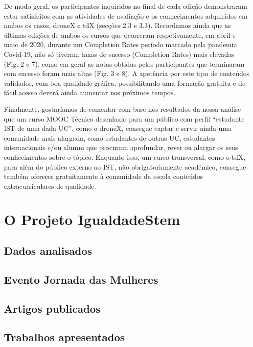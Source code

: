 De modo geral, os participantes inquiridos no final de cada edição demonstraram estar satisfeitos com as atividades de avaliação e os conhecimentos adquiridos em ambos os casos, droneX e tdX (secções 2.3 e 3.3). Recordamos ainda que as últimas edições de ambos os cursos que ocorreram respetivamente, em abril e maio de 2020, durante um
Completion Rates período marcado pela pandemia Covid-19, não só tiveram taxas de sucesso (Completion Rates) mais elevadas (Fig. 2 e
7), como em geral as notas obtidas pelos participantes que terminaram com sucesso foram mais altas (Fig. 3 e 8). A apetência por este tipo de conteúdos validados, com boa qualidade gráfica, possibilitando uma formação gratuita e de fácil acesso deverá ainda aumentar nos próximos tempos.

Finalmente, gostaríamos de comentar com base nos resultados da nossa análise que um curso MOOC Técnico desenhado para um público com perfil “estudante IST de uma dada UC”, como o droneX, consegue captar e servir ainda uma comunidade mais alargada, como estudantes de outras UC, estudantes internacionais e/ou alumni que procuram aprofundar, rever ou alargar os seus conhecimentos sobre o tópico. Enquanto isso, um curso transversal,
como o tdX, para além do público externo ao IST, não obrigatoriamente académico, consegue também oferecer gratuitamente à comunidade da escola conteúdos extracurriculares de qualidade.

\section{O Projeto IgualdadeStem}

\subsection{Dados analisados}

\subsection{Evento Jornada das Mulheres}

\subsection{Artigos publicados}

\subsection{Trabalhos apresentados}





